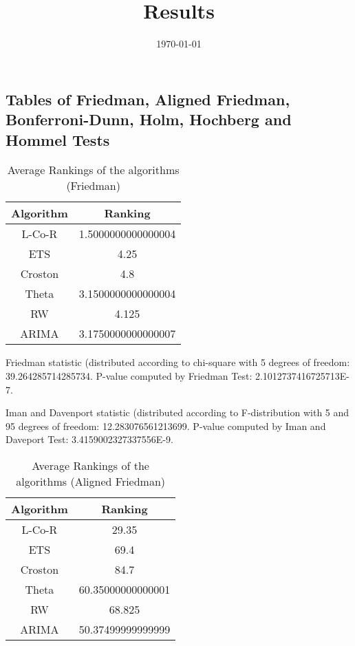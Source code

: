 \documentclass[a4paper,10pt]{article}
\title{Results}
\author{}
\date{\today}
\begin{document}
\begin{landscape}
\oddsidemargin 0in \topmargin 0in\maketitle
\section{Tables of Friedman, Aligned Friedman, Bonferroni-Dunn, Holm, Hochberg and Hommel Tests}
\begin{table}[!htp]
\centering
\caption{Average Rankings of the algorithms (Friedman)
}\begin{tabular}{c|c}
Algorithm&Ranking\\
\hline
L-Co-R&1.5000000000000004\\
ETS&4.25\\
Croston&4.8\\
Theta&3.1500000000000004\\
RW&4.125\\
ARIMA&3.1750000000000007\\
\end{tabular}
\end{table}


Friedman statistic (distributed according to chi-square with 5 degrees of freedom: 39.264285714285734. 
P-value computed by Friedman Test: 2.1012737416725713E-7.\newline

Iman and Davenport statistic (distributed according to F-distribution with 5 and 95 degrees of freedom: 12.283076561213699. 
P-value computed by Iman and Daveport Test: 3.4159002327337556E-9.\newline


\newpage

\begin{table}[!htp]
\centering
\caption{Average Rankings of the algorithms (Aligned Friedman)
}\begin{tabular}{c|c}
Algorithm&Ranking\\
\hline
L-Co-R&29.35\\
ETS&69.4\\
Croston&84.7\\
Theta&60.35000000000001\\
RW&68.825\\
ARIMA&50.37499999999999\\
\end{tabular}
\end{table}



\end{landscape}
\end{document}
